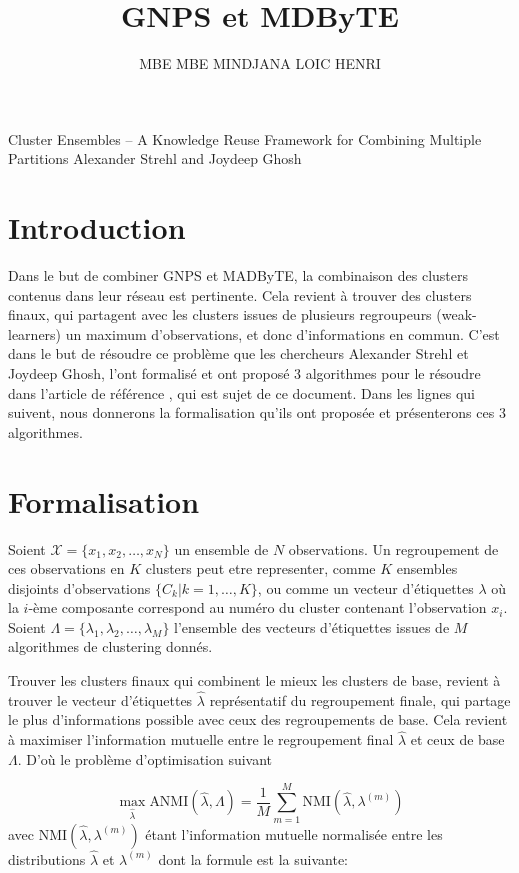 \documentclass[12pt, french, latin.medieval, a4paper]{report}
\author{MBE MBE MINDJANA LOIC HENRI}
\title{GNPS et MDByTE}
\begin{document}
    
    \pagecouverture
    {Cluster Ensembles – A Knowledge Reuse Framework for
	Combining Multiple Partitions}
    {Alexander Strehl and Joydeep Ghosh}

    \tableofcontents
    \vspace{20cm}
    
    \section{Introduction}
    Dans le but de combiner GNPS et MADByTE, la combinaison des clusters contenus dans leur réseau est pertinente.
	Cela revient à trouver des clusters finaux, qui partagent avec les clusters issues de plusieurs regroupeurs (weak-learners) un maximum d'observations, et donc d'informations en commun.
	C'est dans le but de résoudre ce problème que les chercheurs Alexander Strehl et Joydeep Ghosh, l’ont formalisé et ont proposé 3 algorithmes pour le résoudre dans l'article de référence \cite{strehl2002cluster}, qui est sujet de ce document.
	Dans les lignes qui suivent, nous donnerons la formalisation qu'ils ont proposée et présenterons ces 3 algorithmes.

	\section{Formalisation}
	Soient $\mathcal{X} = \{ x_1, x_2, \dots, x_N \}$ un ensemble de $N$ observations.
	Un regroupement de ces observations en $K$ clusters peut etre representer, comme $K$ ensembles disjoints d’observations $\{ C_k | k = 1, \dots, K \}$, ou comme un vecteur d'étiquettes $\lambda$ où la $i$-ème composante correspond au numéro du cluster contenant l'observation $x_i$.
	Soient $\Lambda = \{ \lambda_1, \lambda_2, \dots , \lambda_M \}$ l'ensemble des vecteurs d'étiquettes issues de $M$ algorithmes de clustering donnés.

	Trouver les clusters finaux qui combinent le mieux les clusters de base, revient à trouver le vecteur d'étiquettes $\hat{\lambda}$ représentatif du regroupement finale, qui partage le plus d'informations possible
	avec ceux des regroupements de base.
	Cela revient à maximiser l'information mutuelle entre le regroupement final $\hat{\lambda}$ et ceux de base $\Lambda$. D'où le problème d'optimisation suivant
    
	\begin{equation}
    	\max_{\hat{\lambda}} \text{ANMI}(\hat{\lambda}, \Lambda) = \frac{1}{M} \sum_{m=1}^{M} \text{NMI}(\hat{\lambda}, \lambda^{(m)})
   	 \label{equa:enss1}
    \end{equation}
	avec $\text{NMI}(\hat{\lambda}, \lambda^{(m)})$ étant l'information mutuelle normalisée entre les distributions $\hat{\lambda}$ et $\lambda^{(m)}$ dont la formule est la suivante:
\end{document}
